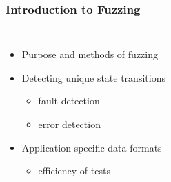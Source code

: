 \begin{frame}
\frametitle{Introduction to Fuzzing}
\begin{columns}
\begin{itemize}
\item{Purpose and methods of fuzzing}
\item{Detecting unique state transitions}
\begin{itemize}
\item{fault detection}
\item{error detection}
\end{itemize}
\item{Application-specific data formats}
\begin{itemize}
\item{efficiency of tests}
\end{itemize}
\end{itemize}
\begin{figure}
\end{figure}
\end{columns}
\end{frame}
